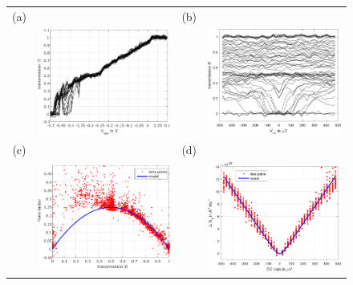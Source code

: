 \begin{figure}[hptb]
	\begin{center}
		\begin{tabular}{c c c c}
			(a) & & (b) & \\
			& \includegraphics[width = 6.5 cm]{./chap2/nu_2_3_D_vs_Vqpc_for_several_Vdc} &
			& \includegraphics[width = 6.5 cm]{./chap2/nu_2_3_D_vs_Vdc_for_several_Vqpc} \\
			(c) & & (d) & \\
			& \includegraphics[width = 6.5 cm]{./chap2/nu_2_3_noise_vs_D_for_several_Vdc} &
			& \includegraphics[width = 6.5 cm]{./chap2/nu_2_3_noise_vs_Vdc_for_D_0_4_0_9}
			

\end{tabular}
\end{center}
\end{figure}
